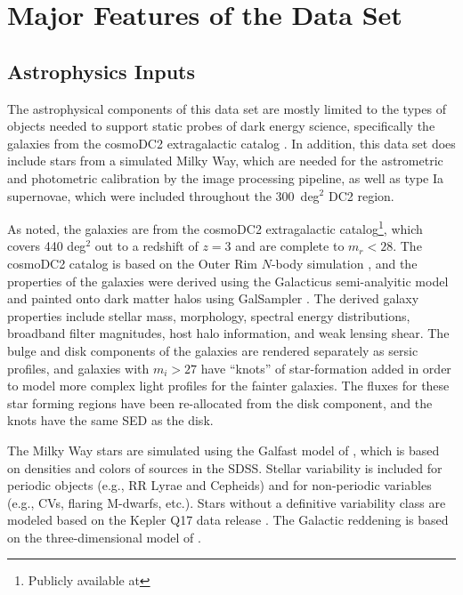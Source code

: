 \documentclass[11pt]{report}
\begin{document}
\section{Major Features of the Data Set}
\label{sec:features}

\subsection{Astrophysics Inputs}

The astrophysical components of this data set are mostly limited to the types of objects needed to support static probes of dark energy science, specifically the galaxies from the cosmoDC2 extragalactic catalog \citep{korytov}.  In addition, this data set does include stars from a simulated Milky Way, which are needed for the astrometric and photometric calibration by the image processing pipeline, as well as type Ia supernovae, which were included throughout the 300~deg$^2$ DC2 region.

As noted, the galaxies are from the cosmoDC2 extragalactic catalog\footnote{Publicly available at }, which covers 440 deg$^2$ out to a redshift of $z = 3$ and are complete to $m_r <28$.  The cosmoDC2 catalog is based on the Outer Rim $N$-body simulation \citep{2019ApJS..245...16H}, and the properties of the galaxies were derived using the Galacticus semi-analyitic model \citep{benson_2010b} and painted onto dark matter halos using GalSampler \citep{2020MNRAS.495.5040H}.  The derived galaxy properties include stellar mass, morphology, spectral energy distributions, broadband filter magnitudes, host halo information, and weak lensing shear.   The bulge and disk components of the galaxies are rendered separately as sersic profiles, and galaxies with $m_i > 27$ have ``knots'' of star-formation added in order to model more complex light profiles for the fainter galaxies. The fluxes for these star forming regions have been re-allocated from the disk component, and the knots have the same SED as the disk.

The Milky Way stars are simulated using the Galfast model of \citet{2008ApJ...673..864J}, which is based on densities and colors of sources in the SDSS. Stellar variability is included for periodic objects (e.g., RR Lyrae and Cepheids) and for non-periodic variables (e.g., CVs, flaring M-dwarfs, etc.).  Stars without a definitive variability class are modeled based on the Kepler Q17 data release \citep{2016ksci.rept....3T}.  The Galactic reddening is based on the three-dimensional model of \cite{2005AJ....130..659A}.
\end{document}
